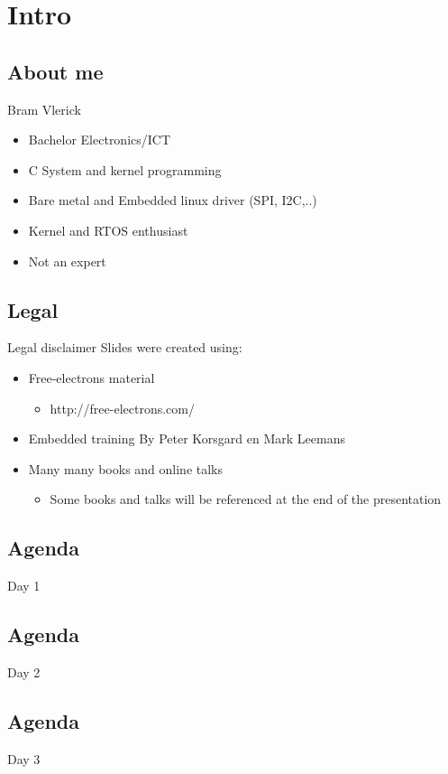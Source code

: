 \documentclass[11pt]{beamer}
\begin{document}
\section{Intro}
\subsection{About me}
\begin{frame}{Bram Vlerick}
\begin{itemize}
\item Bachelor Electronics/ICT
\item C System and kernel programming
\item Bare metal and Embedded linux driver (SPI, I2C,..)
\item Kernel and RTOS enthusiast
\item Not an expert
\end{itemize}
\end{frame}

\subsection{Legal}
\begin{frame}{Legal disclaimer}
Slides were created using:
\begin{itemize}
\item Free-electrons material
\begin{itemize}
\item http://free-electrons.com/
\end{itemize}
\item Embedded training By Peter Korsgard en Mark Leemans
\item Many many books and online talks
\begin{itemize}
\item Some books and talks will be referenced at the end of the presentation
\end{itemize}
\end{itemize}
\end{frame}

\subsection{Agenda}
\begin{frame}{Day 1}
\end{frame}

\subsection{Agenda}
\begin{frame}{Day 2}
\end{frame}

\subsection{Agenda}
\begin{frame}{Day 3}
\end{frame}
\end{document}
